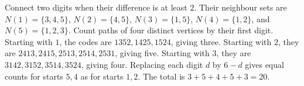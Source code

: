 Connect two digits when their difference is at least $2$. Their neighbour sets are $N(1)=\{3,4,5\}$, $N(2)=\{4,5\}$, $N(3)=\{1,5\}$, $N(4)=\{1,2\}$, and $N(5)=\{1,2,3\}$. Count paths of four distinct vertices by their first digit. Starting with $1$, the codes are $1352,1425,1524$, giving three. Starting with $2$, they are $2413,2415,2513,2514,2531$, giving five. Starting with $3$, they are $3142,3152,3514,3524$, giving four. Replacing each digit $d$ by $6-d$ gives equal counts for starts $5,4$ as for starts $1,2$. The total is $3+5+4+5+3=\boxed{20}$.
